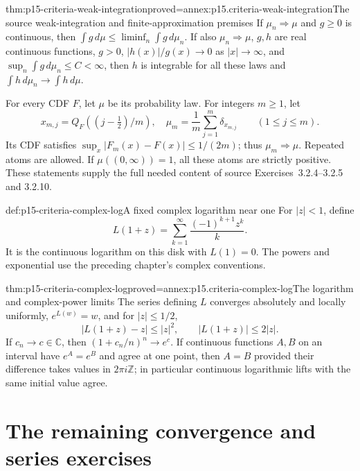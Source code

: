 \begin{hbtheorem}{thm:p15-criteria-weak-integration}{proved=annex:p15.criteria-weak-integration}{The source weak-integration and finite-approximation premises}
If \(\mu_n\Rightarrow\mu\) and \(g\geq0\) is continuous, then
\(\int g\,d\mu\leq\liminf_n\int g\,d\mu_n\).
If also \(\mu_n\Rightarrow\mu\), \(g,h\) are real continuous
functions, \(g>0\),
\(|h(x)|/g(x)\to0\) as \(|x|\to\infty\), and
\(\sup_n\int g\,d\mu_n\leq C<\infty\), then \(h\) is
integrable for all these laws and
\(\int h\,d\mu_n\to\int h\,d\mu\).

For every CDF \(F\), let \(\mu\) be its probability law.
For integers \(m\geq1\), let
\[
 x_{m,j}=Q_F((j-\tfrac12)/m),\quad
 \mu_m=\frac1m\sum_{j=1}^m\delta_{x_{m,j}}
                           \qquad(1\leq j\leq m).
\]
Its CDF satisfies \(\sup_x|F_m(x)-F(x)|\leq1/(2m)\);
thus \(\mu_m\Rightarrow\mu\). Repeated atoms are allowed.
If \(\mu((0,\infty))=1\), all these atoms are strictly positive.
These statements supply the full needed content of source
Exercises~3.2.4--3.2.5 and 3.2.10.
\end{hbtheorem}

\begin{hbdefinition}{def:p15-criteria-complex-log}{A fixed complex logarithm near one}
For \(|z|<1\), define
\[
 L(1+z)=\sum_{k=1}^\infty\frac{(-1)^{k+1}z^k}{k}.
\]
It is the continuous logarithm on this disk with \(L(1)=0\).
The powers and exponential use the preceding chapter's complex
conventions.
\end{hbdefinition}

\begin{hblemma}{thm:p15-criteria-complex-log}{proved=annex:p15.criteria-complex-log}{The logarithm and complex-power limits}
The series defining \(L\) converges absolutely and locally
uniformly, \(e^{L(w)}=w\), and for \(|z|\leq1/2\),
\[
 |L(1+z)-z|\leq |z|^2,\qquad |L(1+z)|\leq2|z|.
\]
If \(c_n\to c\in\mathbb C\), then
\((1+c_n/n)^n\to e^c\).
If continuous functions \(A,B\) on an interval have
\(e^A=e^B\) and agree at one point, then \(A=B\)
provided their difference takes values in \(2\pi i\mathbb Z\);
in particular continuous logarithmic lifts with the same
initial value agree.
\end{hblemma}

\section{The remaining convergence and series exercises}
\label{sec:p15-criteria-convergence-exercises}


